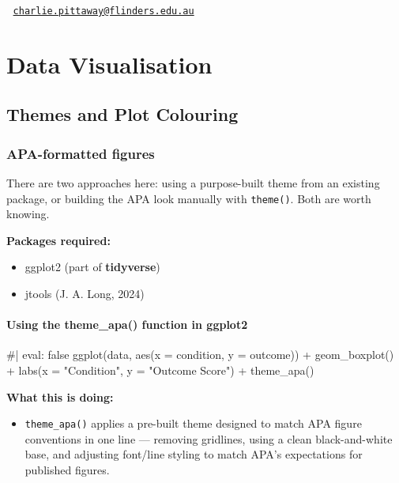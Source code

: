 \documentclass[
  letterpaper,
  DIV=11,
  numbers=noendperiod]{scrreprt}
\newenvironment{Shaded}{\begin{snugshade}}{\end{snugshade}}
\newcommand{\AttributeTok}[1]{\textcolor[rgb]{0.40,0.45,0.13}{#1}}
\newcommand{\CommentTok}[1]{\textcolor[rgb]{0.37,0.37,0.37}{#1}}
\newcommand{\FunctionTok}[1]{\textcolor[rgb]{0.28,0.35,0.67}{#1}}
\newcommand{\NormalTok}[1]{\textcolor[rgb]{0.00,0.23,0.31}{#1}}
\newcommand{\SpecialCharTok}[1]{\textcolor[rgb]{0.37,0.37,0.37}{#1}}
\newcommand{\StringTok}[1]{\textcolor[rgb]{0.13,0.47,0.30}{#1}}
\providecommand{\tightlist}{%
  \setlength{\itemsep}{0pt}\setlength{\parskip}{0pt}}\usepackage{longtable,booktabs,array}
\begin{document}
📧
\href{mailto:charlie.pittaway@flinders.edu.au}{\nolinkurl{charlie.pittaway@flinders.edu.au}}

\part{Data Visualisation}

\chapter{Themes and Plot Colouring}\label{themes-and-plot-colouring}

\section{APA-formatted figures}\label{apa-formatted-figures}

There are two approaches here: using a purpose-built theme from an
existing package, or building the APA look manually with
\texttt{theme()}. Both are worth knowing.

\textbf{Packages required:}

\begin{itemize}
\item
  ggplot2 (part of \textbf{tidyverse})
\item
  jtools (J. A. Long, 2024)
\end{itemize}

\subsection{Using the theme\_apa() function in
ggplot2}\label{using-the-theme_apa-function-in-ggplot2}

\begin{Shaded}
\begin{Highlighting}[]
\CommentTok{\#| eval: false}
\FunctionTok{ggplot}\NormalTok{(data, }\FunctionTok{aes}\NormalTok{(}\AttributeTok{x =}\NormalTok{ condition, }\AttributeTok{y =}\NormalTok{ outcome)) }\SpecialCharTok{+}
  \FunctionTok{geom\_boxplot}\NormalTok{() }\SpecialCharTok{+}
  \FunctionTok{labs}\NormalTok{(}\AttributeTok{x =} \StringTok{"Condition"}\NormalTok{, }\AttributeTok{y =} \StringTok{"Outcome Score"}\NormalTok{) }\SpecialCharTok{+}
  \FunctionTok{theme\_apa}\NormalTok{()}
\end{Highlighting}
\end{Shaded}

\textbf{What this is doing:}

\begin{itemize}
\tightlist
\item
  \texttt{theme\_apa()} applies a pre-built theme designed to match APA
  figure conventions in one line --- removing gridlines, using a clean
  black-and-white base, and adjusting font/line styling to match APA's
  expectations for published figures.
\end{itemize}
\end{document}
